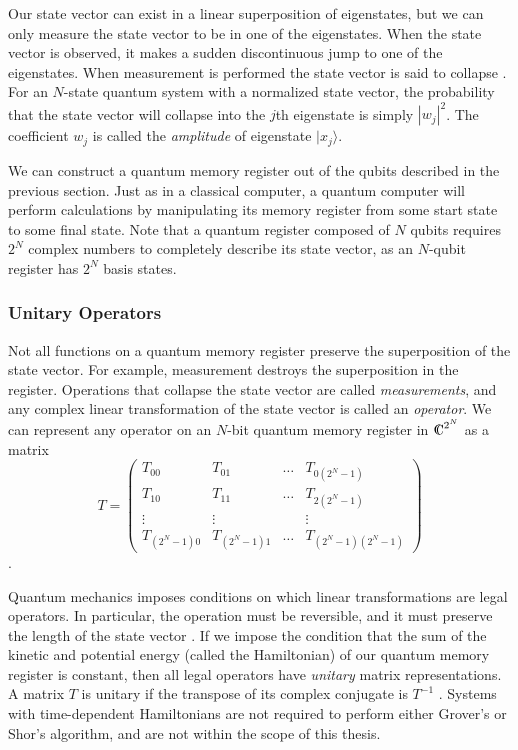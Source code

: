 Our state vector can exist in a linear superposition of eigenstates,
but we can only measure the state vector to be in one of the
eigenstates.  When the state vector is observed, it makes a sudden
discontinuous jump to one of the eigenstates.  When measurement is
performed the state vector is said to collapse
\cite{williams98quantum}.  For an $N$-state quantum system with a 
normalized state vector, the probability that the state vector will
collapse into the $j$th eigenstate is simply $|w_{j}|^{2}$.  The
coefficient $w_{j}$ is called the \emph{amplitude} of eigenstate
$|x_{j}\rangle$.

We can construct a quantum memory register out of the qubits described
in the previous section.  Just as in a classical computer, a quantum
computer will perform calculations by manipulating its memory register
from some start state to some final state.  Note that a quantum
register composed of $N$ qubits requires $2^{N}$ complex numbers to
completely describe its state vector, as an $N$-qubit register has
$2^{N}$ basis states.

\subsubsection{Unitary Operators}

Not all functions on a quantum memory register preserve the
superposition of the state vector.  For example, measurement destroys
the superposition in the register.  Operations that collapse the state
vector are called \emph{measurements}, and any complex linear
transformation of the state vector is called an
\emph{operator}.  We can represent any operator on an $N$-bit 
quantum memory register in $\Complex^{2^{N}}$ as a matrix
\[T = \left( \begin{array}{cccc}
	T_{00} & T_{01} & \ldots & T_{0(2^{N}-1)} \\ T_{10} & T_{11} &
	\ldots & T_{2(2^{N}-1)} \\ \vdots & \vdots & & \vdots \\
	T_{(2^{N}-1)0} & T_{(2^{N}-1)1} & \ldots &
	T_{(2^{N}-1)(2^{N}-1)}
\end{array}\right) \] 
\cite{griffiths95quantum}.

Quantum mechanics imposes conditions on which linear transformations
are legal operators.  In particular, the operation must be reversible,
and it must preserve the length of the state vector
\cite{griffiths95quantum}.  If we impose the condition that the sum of
the kinetic and potential energy (called the Hamiltonian) of our
quantum memory register is constant, then all legal operators have
\emph{unitary} matrix representations.  A matrix $T$ is unitary if the
transpose of its complex conjugate is $T^{-1}$
\cite{griffiths95quantum}.  Systems with time-dependent Hamiltonians 
are not required to perform either Grover's or Shor's algorithm, and
are not within the scope of this thesis.

